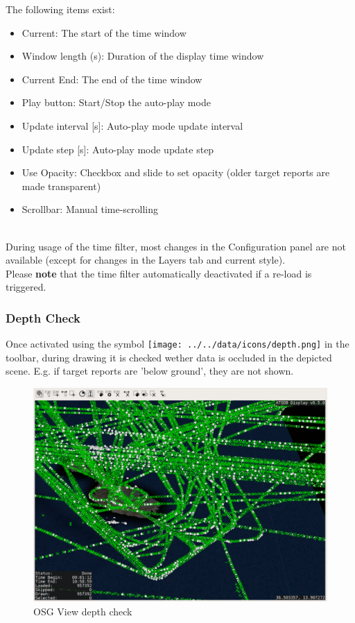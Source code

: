 The following items exist:

\begin{itemize}
 \item Current: The start of the time window
 \item Window length (s): Duration of the display time window
 \item Current End: The end of the time window
 \item Play button: Start/Stop the auto-play mode
 \item Update interval [s]: Auto-play mode update interval
 \item Update step [s]: Auto-play mode update step
 \item Use Opacity: Checkbox and slide to set opacity (older target reports are made transparent)
 \item Scrollbar: Manual time-scrolling
\end{itemize}
\ \\

During usage of the time filter, most changes in the Configuration panel are not available (except for changes in the Layers tab and current style). \\

Please \textbf{note} that the time filter automatically deactivated if a re-load is triggered.

\subsubsection{Depth Check}

Once activated using the symbol \texttt{[image: ../../data/icons/depth.png]} in the toolbar, during drawing it is checked wether data is occluded in the depicted scene. E.g. if target reports are 'below ground', they are not shown.

\begin{figure}[H]
    \hspace*{-2cm}
    \includegraphics[width=18cm,frame]{figures/osgview_depth_check.png}
  \caption{OSG View depth check}
\end{figure}

